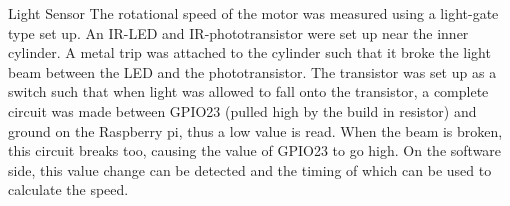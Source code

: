 \documentclass[twoside,a4]{report}
\def\br{\newline \newline \noindent}
\begin{document}
\large Light Sensor \normalsize \br
The rotational speed of the motor was measured using a light-gate type set up. An IR-LED and IR-phototransistor were set up near the inner cylinder. A metal trip was attached to the cylinder such that it broke the light beam between the LED and the phototransistor. The transistor was set up as a switch such that when light was allowed to fall onto the transistor, a complete circuit was made between GPIO23 (pulled high by the build in resistor) and ground on the Raspberry pi, thus a low value is read. When the beam is broken, this circuit breaks too, causing the value of GPIO23 to go high. On the software side, this value change can be detected and the timing of which can be used to calculate the speed. \newline
\end{document}
